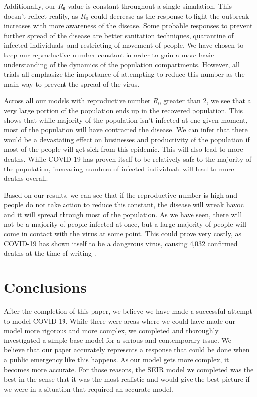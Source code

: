 \documentclass[12pt, a4paper]{article}
\begin{document}
    Additionally, our $R_0$ value is constant throughout a single simulation. This doesn't reflect reality, as $R_0$ could decrease as the response to fight the outbreak increases with more awareness of the disease. Some probable responses to prevent further spread of the disease are better sanitation techniques, quarantine of infected individuals, and restricting of movement of people. We have chosen to keep our reproductive number constant in order to gain a more basic understanding of the dynamics of the population compartments. However, all trials all emphasize the importance of attempting to reduce this number as the main way to prevent the spread of the virus.
    
    Across all our models with reproductive number $R_0$ greater than 2, we see that a very large portion of the population ends up in the recovered population. This shows that while majority of the population isn't infected at one given moment, most of the population will have contracted the disease. We can infer that there would be a devastating effect on businesses and productivity of the population if most of the people will get sick from this epidemic. This will also lead to more deaths. While COVID-19 has proven itself to be relatively safe to the majority of the population, increasing numbers of infected individuals will lead to more deaths overall. 
    
    Based on our results, we can see that if the reproductive number is high and people do not take action to reduce this constant, the disease will wreak havoc and it will spread through most of the population. As we have seen, there will not be a majority of people infected at once, but a large majority of people will come in contact with the virus at some point. This could prove very costly, as COVID-19 has shown itself to be a dangerous virus, causing 4,032 confirmed deaths at the time of writing \cite{who}.
    
    \section{Conclusions}
    
    After the completion of this paper, we believe we have made a successful attempt to model COVID-19. While there were areas where we could have made our model more rigorous and more complex, we completed and thoroughly investigated a simple base model for a serious and contemporary issue. We believe that our paper accurately represents a response that could be done when a public emergency like this happens. As our model gets more complex, it becomes more accurate. For those reasons, the SEIR model we completed was the best in the sense that it was the most realistic and would give the best picture if we were in a situation that required an accurate model. 
    
\end{document}
